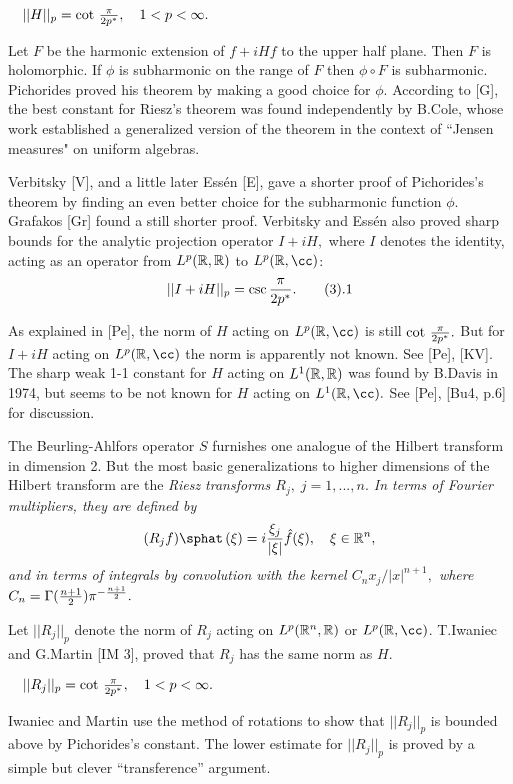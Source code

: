  $\quad ||H||_p = \cot\,{{\pi}\over 
{2p^*}},\quad 1<p<\infty.$ \endproclaim                            

Let $F$ be the harmonic extension of $f+i Hf$ to the upper half plane. Then 
$F$ is holomorphic. If 
$\phi$ is subharmonic on the range of $F$ then $\phi\circ F$ is subharmonic. 
Pichorides proved his theorem by making a good choice for $\phi.$ According 
to [G], the best constant for Riesz's theorem was found independently by 
B.Cole, whose work established a generalized version of the theorem in 
the context of ``Jensen measures" on uniform algebras. 

Verbitsky [V], and a little later Ess\'en [E], gave a shorter proof of 
Pichorides's theorem  
by finding an even better choice for the subharmonic function $\phi.$ Grafakos
[Gr] found a still shorter proof. Verbitsky and Ess\'en also 
proved sharp bounds for the analytic projection operator $I+iH,$ where $I$ 
denotes the identity, acting as an operator from $L^p(\Bbb R, \Bbb R)$ to $L^p(\rr, 
\cc)$:  $$||I + iH||_p = \csc {{\pi}\over {2p^*}}.\tag3.1$$

As explained in [Pe], the norm of $H$ acting on $L^p(\rr, \cc)$ is still 
$\cot\,{{\pi}\over {2p^*}}.$ But for $I+iH$ acting on $L^p(\rr, \cc)$ the norm 
is apparently not known. See [Pe], [KV]. The sharp weak 1-1 constant for 
$H$ acting on $L^1(\Bbb R, \Bbb R)$ was found by B.Davis in 1974, but seems to be not
known for $H$ acting on $L^1(\rr, \cc).$ See [Pe], [Bu4, p.6] for discussion.  

The Beurling-Ahlfors operator $S$ furnishes one analogue of the Hilbert 
transform in dimension 2. But the most basic generalizations to higher 
dimensions of the Hilbert transform  are the \it Riesz transforms \rm  
$R_j,\;j=1,...,n.$  In terms of Fourier multipliers, they are 
defined by $$(R_jf)\sphat \,(\xi) = i{{{\xi}_j}\over {|\xi |}} \hat 
f(\xi),\quad \xi  
\in {\rr}^n,$$ and in terms of integrals by convolution with the kernel 
$C_n x_j/|x|^{n+1},$ where \newline $C_n = \Gamma({{n+1}\over 2}){\pi}^{- 
{{n+1}\over 2}} .$ 

Let $||R_j||_p$ denote the norm of $R_j$ acting on $L^p({\Bbb R}^n, \Bbb R)$ or
$L^p(\rr, \cc)$. 
T.Iwaniec and G.Martin [IM 3], proved that $R_j$ has the same 
norm as $H$.

 $\quad||R_j||_p = \cot\,{{\pi}\over 
{2p^*}},\quad 1<p<\infty.$ \endproclaim  

Iwaniec and Martin use the method of rotations to show that $||R_j||_p$  
is bounded above by Pichorides's constant. The lower estimate for $||R_j||_p$ is 
proved by a simple but clever ``transference'' argument.  

